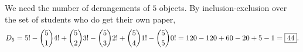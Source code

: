 We need the number of derangements of $5$ objects. By inclusion-exclusion over the set of students who do get their own paper,
\[
D_5=5!-\dbinom51 4!+\dbinom52 3!-\dbinom53 2!+\dbinom54 1!-\dbinom55 0!=120-120+60-20+5-1=\boxed{44}.
\]

